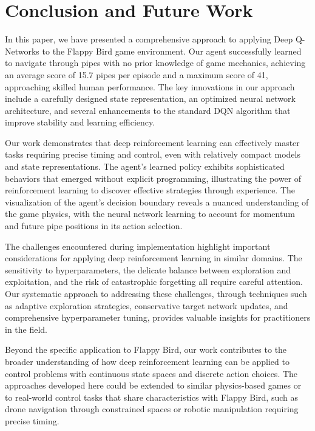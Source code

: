 \section{Conclusion and Future Work}

In this paper, we have presented a comprehensive approach to applying Deep Q-Networks to the Flappy Bird game environment. Our agent successfully learned to navigate through pipes with no prior knowledge of game mechanics, achieving an average score of 15.7 pipes per episode and a maximum score of 41, approaching skilled human performance. The key innovations in our approach include a carefully designed state representation, an optimized neural network architecture, and several enhancements to the standard DQN algorithm that improve stability and learning efficiency.

Our work demonstrates that deep reinforcement learning can effectively master tasks requiring precise timing and control, even with relatively compact models and state representations. The agent's learned policy exhibits sophisticated behaviors that emerged without explicit programming, illustrating the power of reinforcement learning to discover effective strategies through experience. The visualization of the agent's decision boundary reveals a nuanced understanding of the game physics, with the neural network learning to account for momentum and future pipe positions in its action selection.

The challenges encountered during implementation highlight important considerations for applying deep reinforcement learning in similar domains. The sensitivity to hyperparameters, the delicate balance between exploration and exploitation, and the risk of catastrophic forgetting all require careful attention. Our systematic approach to addressing these challenges, through techniques such as adaptive exploration strategies, conservative target network updates, and comprehensive hyperparameter tuning, provides valuable insights for practitioners in the field.

Beyond the specific application to Flappy Bird, our work contributes to the broader understanding of how deep reinforcement learning can be applied to control problems with continuous state spaces and discrete action choices. The approaches developed here could be extended to similar physics-based games or to real-world control tasks that share characteristics with Flappy Bird, such as drone navigation through constrained spaces or robotic manipulation requiring precise timing.


